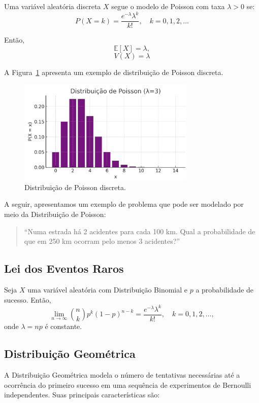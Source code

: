 \documentclass{article}
\begin{document}
Uma variável aleatória discreta $X$ segue o modelo de Poisson com taxa $\lambda > 0$ se:
    $$
    P(X = k) = \frac{e^{-\lambda} \lambda^k}{k!}, \quad k = 0, 1, 2, \ldots
    $$

Então,
    $$
    \mathbb{E}[X] = \lambda,
    $$
    $$
    V(X) = \lambda
    $$

A Figura~\ref{fig:dist_disc_poisson} apresenta um exemplo de distribuição de Poisson discreta.

\begin{figure}[H]
    \centering
    \includegraphics[width=0.75\textwidth]{figuras/dist_disc_poisson.png}
    \caption{Distribuição de Poisson discreta.}
    \label{fig:dist_disc_poisson}
\end{figure}

A seguir, apresentamos um exemplo de problema que pode ser modelado por meio da Distribuição de Poisson:
\begin{quote}
``Numa estrada há 2 acidentes para cada 100 km. Qual a probabilidade de que em 250 km ocorram pelo menos 3 acidentes?''
\end{quote}

\subsection{Lei dos Eventos Raros}
Seja $X$ uma variável aleatória com Distribuição Binomial e $p$ a probabilidade de sucesso. Então,
    $$
    \lim_{n \to \infty} \binom{n}{k} p^k (1 - p)^{n - k} = \frac{e^{-\lambda} \lambda^k}{k!}, \quad k = 0, 1, 2, \ldots,
    $$
onde $\lambda = np$ é constante.

\subsection{Distribuição Geométrica}
A Distribuição Geométrica modela o número de tentativas necessárias até a ocorrência do primeiro sucesso em uma sequência de experimentos de Bernoulli independentes. Suas principais características são:
\end{document}
